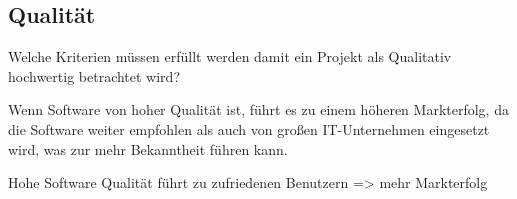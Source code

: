 \subsection{Qualität}

\rawidea




Welche Kriterien müssen erfüllt werden damit ein Projekt als Qualitativ hochwertig betrachtet wird?




Wenn Software von hoher Qualität ist, führt es zu einem höheren Markterfolg, da die Software 
weiter empfohlen als auch von großen IT-Unternehmen eingesetzt wird, was zur mehr Bekanntheit
führen kann.

\begin{hypothesis}
    Hohe Software Qualität führt zu zufriedenen Benutzern => mehr Markterfolg
\end{hypothesis}